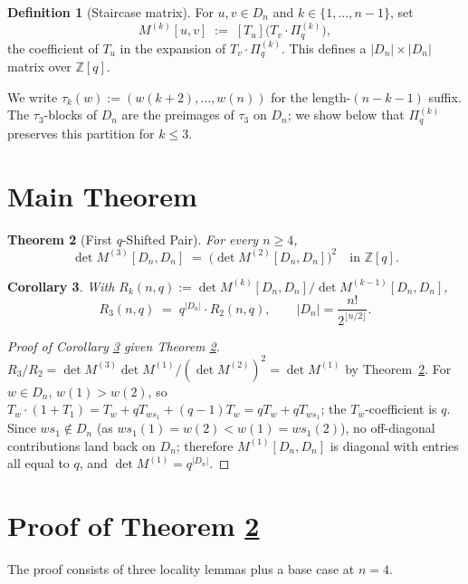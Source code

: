 \documentclass[11pt]{article}
\newtheorem{theorem}{Theorem}
\newtheorem{corollary}[theorem]{Corollary}
\theoremstyle{definition}
\newtheorem{definition}[theorem]{Definition}
\begin{document}
\begin{definition}[Staircase matrix]
For $u, v \in D_n$ and $k \in \{1, \ldots, n-1\}$, set
\[
M^{(k)}[u, v] \;:=\; [T_u]\bigl(T_v \cdot \Pi^{(k)}_q\bigr),
\]
the coefficient of $T_u$ in the expansion of $T_v \cdot \Pi^{(k)}_q$.
This defines a $|D_n| \times |D_n|$ matrix over $\mathbb{Z}[q]$.
\end{definition}

We write $\tau_k(w) := (w(k+2), \ldots, w(n))$ for the length-$(n-k-1)$ suffix.
The $\tau_3$-blocks of $D_n$ are the preimages of $\tau_3$ on $D_n$; we show
below that $\Pi^{(k)}_q$ preserves this partition for $k \leq 3$.

\section{Main Theorem}

\begin{theorem}[First $q$-Shifted Pair]
\label{thm:main}
For every $n \geq 4$,
\[
\det M^{(3)}[D_n, D_n] \;=\; \bigl(\det M^{(2)}[D_n, D_n]\bigr)^2 \quad \text{in } \mathbb{Z}[q].
\]
\end{theorem}

\begin{corollary}
\label{cor:ratio}
With $R_k(n, q) := \det M^{(k)}[D_n, D_n] / \det M^{(k-1)}[D_n, D_n]$,
\[
R_3(n, q) \;=\; q^{|D_n|} \cdot R_2(n, q), \qquad |D_n| = \frac{n!}{2^{\lfloor n/2 \rfloor}}.
\]
\end{corollary}

\begin{proof}[Proof of Corollary \ref{cor:ratio} given Theorem \ref{thm:main}]
$R_3/R_2 = \det M^{(3)} \det M^{(1)} / (\det M^{(2)})^2 = \det M^{(1)}$ by Theorem~\ref{thm:main}.
For $w \in D_n$, $w(1) > w(2)$, so $T_w \cdot (1+T_1) = T_w + q T_{ws_1} + (q-1) T_w = q T_w + q T_{ws_1}$;
the $T_w$-coefficient is $q$. Since $ws_1 \not\in D_n$ (as $ws_1(1) = w(2) < w(1) = ws_1(2)$),
no off-diagonal contributions land back on $D_n$; therefore $M^{(1)}[D_n, D_n]$ is diagonal
with entries all equal to $q$, and $\det M^{(1)} = q^{|D_n|}$.
\end{proof}

\section{Proof of Theorem \ref{thm:main}}

The proof consists of three locality lemmas plus a base case at $n=4$.
\end{document}

